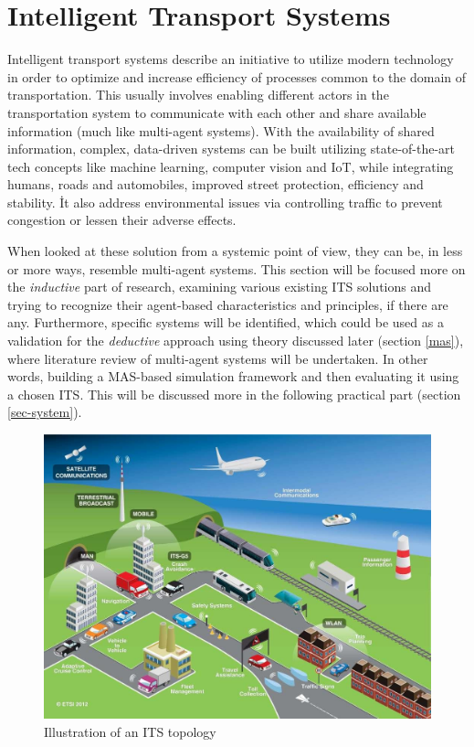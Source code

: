 \documentclass[main.tex]{subfiles}
\begin{document}
\section{Intelligent Transport Systems}\label{its}

Intelligent transport systems describe an initiative to utilize modern technology 
in order to optimize and increase efficiency of processes common to the domain of transportation. 
This usually involves enabling different actors in the transportation system to communicate 
with each other and share available information (much like multi-agent systems). With the 
availability of shared information, complex, data-driven systems can be built utilizing 
state-of-the-art tech concepts like machine learning, computer vision and IoT, while
integrating humans, roads and automobiles, improved street protection, efficiency and stability.
İt also address environmental issues via controlling traffic to prevent congestion or lessen
their adverse effects. 

When looked at these solution from a systemic point of view, they can 
be, in less or more ways, resemble multi-agent systems. This section will be focused more on 
the \emph{inductive} part of research, examining various existing ITS solutions and trying 
to recognize their agent-based characteristics and principles, if there are any. Furthermore, 
specific systems will be identified, which could be used as a validation for the \emph{deductive}
approach using theory discussed later (section \ref{mas}), where literature review of multi-agent systems 
will be undertaken. In other words, building a MAS-based simulation framework and then evaluating it 
using a chosen ITS. This will be discussed more in the following practical part (section 
\ref{sec-system}).

\begin{figure}[htbp]
    \centering
    \includegraphics[width=.8\textwidth]{ITS-schema.jpg}
    \caption{Illustration of an ITS topology \cite{ETSI}}
    \label{its-map}
\end{figure}
\end{document}
